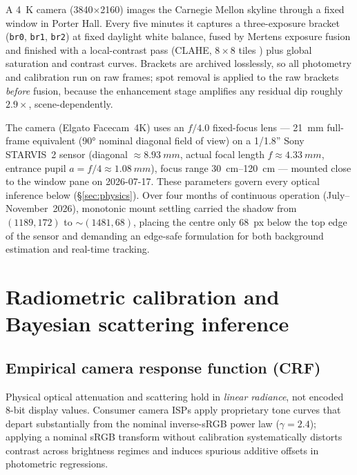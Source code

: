 \documentclass[11pt,a4paper]{article}
\newcommand{\code}[1]{\texttt{\small #1}}
\begin{document}
A \SI{4}{K} camera (\num{3840}$\times$\num{2160}) images the Carnegie Mellon skyline
through a fixed window in Porter Hall. Every five minutes it captures a three-exposure
bracket (\code{br0}, \code{br1}, \code{br2}) at fixed daylight white balance, fused by
Mertens exposure fusion \citep{mertens2009exposure} and finished with a local-contrast
pass (CLAHE, $8\times 8$ tiles \citep{pizer1987adaptive,zuiderveld1994clahe}) plus
global saturation and contrast curves. Brackets are archived losslessly, so all
photometry and calibration run on raw frames; spot removal is applied to the raw
brackets \emph{before} fusion, because the enhancement stage amplifies any residual dip
roughly $2.9\times$, scene-dependently.

The camera (Elgato Facecam~4K) uses an $f/4.0$ fixed-focus lens --- \SI{21}{mm}
full-frame equivalent (\ang{90} nominal diagonal field of view) on a 1/1.8'' Sony
STARVIS~2 sensor (diagonal $\approx\SI{8.93}{mm}$, actual focal length
$f \approx \SI{4.33}{mm}$, entrance pupil $a = f/4 \approx \SI{1.08}{mm}$), focus range
\SIrange{30}{120}{cm} --- mounted close to the window pane on 2026-07-17. These
parameters govern every optical inference below (\S\ref{sec:physics}). Over four months
of continuous operation (July--November~2026), monotonic mount settling carried the
shadow from $(1189, 172)$ to $\sim(1481, 68)$, placing the centre only \SI{68}{px}
below the top edge of the sensor and demanding an edge-safe formulation for both
background estimation and real-time tracking.

\section{Radiometric calibration and Bayesian scattering inference}
\label{sec:inference}

\subsection{Empirical camera response function (CRF)}
\label{sec:crf}

Physical optical attenuation and scattering hold in \emph{linear radiance}, not encoded
8-bit display values. Consumer camera ISPs apply proprietary tone curves that depart
substantially from the nominal inverse-sRGB power law ($\gamma = 2.4$); applying a
nominal sRGB transform without calibration systematically distorts contrast across
brightness regimes and induces spurious additive offsets in photometric regressions.
\end{document}
